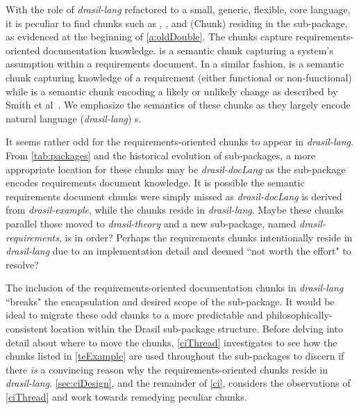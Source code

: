 With the role of \textit{drasil-lang} refactored to a small, generic, flexible, core language, it is peculiar to find chunks such as , , and  (Chunk) residing in the sub-package, as evidenced at the beginning of \autoref{a:oldDouble}. The chunks capture requirements-oriented documentation knowledge.  is a semantic chunk capturing a system's assumption within a requirements document. In a similar fashion,  is a semantic chunk capturing knowledge of a requirement (either functional or non-functional) while  is a semantic chunk encoding a likely or unlikely change as described by Smith et al~\cite{smith2005new}. We emphasize the semantics of these chunks as they largely encode natural language (\textit{drasil-lang}) s.

It seems rather odd for the requirements-oriented chunks to appear in \textit{drasil-lang}. From \autoref{tab:packages} and the historical evolution of sub-packages, a more appropriate location for these chunks may be \textit{drasil-docLang} as the sub-package encodes requirements document knowledge. It is possible the semantic requirements document chunks were simply missed as \textit{drasil-docLang} is derived from \textit{drasil-example}, while the chunks reside in \textit{drasil-lang}. Maybe these chunks parallel those moved to \textit{drasil-theory} and a new sub-package, named \textit{drasil-requirements}, is in order? Perhaps the requirements chunks intentionally reside in \textit{drasil-lang} due to an implementation detail and deemed ``not worth the effort" to resolve?

The inclusion of the requirements-oriented documentation chunks in \textit{drasil-lang} ``breaks" the encapsulation and desired scope of the sub-package. It would be ideal to migrate these odd chunks to a more predictable and philosophically-consistent location within the Drasil sub-package structure. Before delving into detail about where to move the chunks, \autoref{ciThread} investigates to see how the chunks listed in \autoref{teExample} are used throughout the sub-packages to discern if there \textit{is} a convincing reason why the requirements-oriented chunks reside in \textit{drasil-lang}. \autoref{sec:ciDesign}, and the remainder of \autoref{ci}, considers the observations of \autoref{ciThread} and work towards remedying peculiar chunks.


